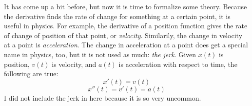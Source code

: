 \documentclass[../revisedmain.tex]{subfiles}
\begin{document}
	It has come up a bit before, but now it is time to formalize some theory. Because the derivative finds the rate of change for something at a certain point, it is useful in physics. For example, the derivative of a position function gives the rate of change of position of that point, or \textit{velocity}. Similarily, the change in velocity at a point is \textit{acceleration}. The change in acceleration at a point does get a special name in physics, too, but it is not used as much: \textit{the jerk}. Given $x(t)$ is position, $v(t)$ is velocity, and $a(t)$ is acceleration with respect to time, the following are true: $$x'(t)=v(t)$$$$x''(t)=v'(t)=a(t)$$ I did not include the jerk in here because it is so very uncommon.
\end{document}
